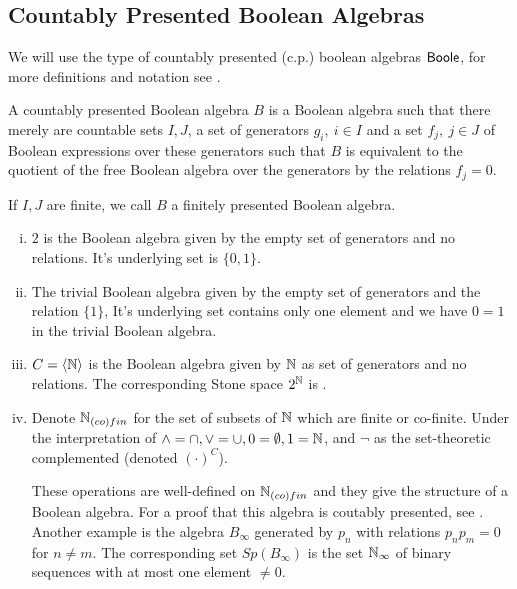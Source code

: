 \subsection{Countably Presented Boolean Algebras}
We will use the type of countably presented (c.p.) boolean algebras $\mathsf{Boole}$,
for more definitions and notation see .

\begin{definition}
  A countably presented Boolean algebra $B$ is a Boolean algebra such that there merely are 
  countable sets $I,J$, 
  a set of generators $g_i,~{i\in I}$ and a set $f_j,~{j\in J}$ of Boolean expressions over these generators 
  such that $B$ is equivalent to the quotient of the free Boolean algebra over the generators by the relations
  $f_j=0$. 
\end{definition} 
If $I,J$ are finite, we call $B$ a finitely presented Boolean algebra. 

\begin{example}
  \begin{enumerate}[(i)]
  \item $2$ is the Boolean algebra given by the empty set of generators and no relations. 
    It's underlying set is $\{0,1\}$. 
  \item   The trivial Boolean algebra given by the empty set of generators and the relation $\{1\}$, 
    It's underlying set contains only one element and we have $0=1$ in the trivial Boolean algebra. 
  \item\label{ExampleBAunderCantor}   $C = \langle \mathbb{N} \rangle $ is the Boolean algebra given by $\mathbb{N}$ as set of generators and no relations. The corresponding Stone space $2^{\mathbb{N}}$ is .
  \item\label{ExampleBAunderNinfty}
    Denote $\mathbb{N}_{(co)fin}$ for the set of subsets of $\mathbb{N}$ which are finite or co-finite. 
    Under the interpretation of $\wedge = \cap , \vee = \cup, 0 = \emptyset, 1 = \mathbb{N}$, and $\neg$ 
    as the set-theoretic complemented (denoted $(\cdot)^C$). 
    
    These operations are well-defined on $\mathbb{N}_{(co)fin}$ 
    and they give the structure of a Boolean algebra. For a proof that this algebra is coutably presented, see .
    Another example is the algebra $B_{\infty}$ generated by $p_n$ with relations $p_np_m = 0$ for $n\neq m$. The corresponding
set $Sp(B_{\infty})$ is the set $\mathbb{N}_{\infty}$ of binary sequences with at most one element $\neq 0$.

  \end{enumerate}
\end{example}

